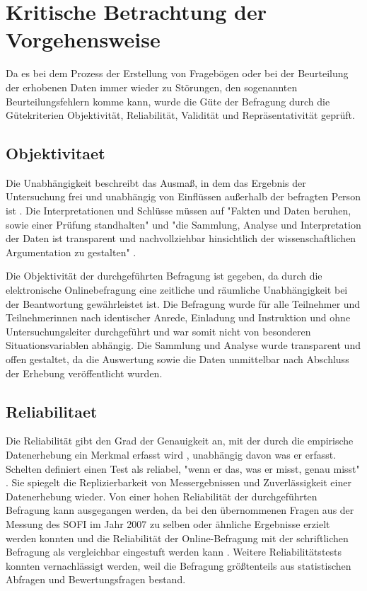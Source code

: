 \section{Kritische Betrachtung der Vorgehensweise}

Da es bei dem Prozess der Erstellung von Fragebögen oder bei der Beurteilung der erhobenen Daten immer wieder zu Störungen, den sogenannten Beurteilungsfehlern komme kann, wurde die Güte der Befragung durch die Gütekriterien Objektivität, Reliabilität, Validität und Repräsentativität geprüft.

\subsection{Objektivitaet}

Die Unabhängigkeit beschreibt das Ausmaß, in dem das Ergebnis der Untersuchung frei und unabhängig von Einflüssen außerhalb der befragten Person ist \cite{rost_2004_lehrbuch}. Die Interpretationen und Schlüsse müssen auf "Fakten und Daten beruhen, sowie einer Prüfung standhalten" und "die Sammlung, Analyse und Interpretation der Daten ist transparent und nachvollziehbar hinsichtlich der wissenschaftlichen Argumentation zu gestalten" \cite{Bargheer_2015}.

Die Objektivität der durchgeführten Befragung ist gegeben, da durch die elektronische Onlinebefragung eine zeitliche und räumliche Unabhängigkeit bei der Beantwortung gewährleistet ist. Die Befragung wurde für alle Teilnehmer und Teilnehmerinnen nach identischer Anrede, Einladung und Instruktion und ohne Untersuchungsleiter durchgeführt und war somit nicht von besonderen Situationsvariablen abhängig. Die Sammlung und Analyse wurde transparent und offen gestaltet, da die Auswertung sowie die Daten unmittelbar nach Abschluss der Erhebung veröffentlicht wurden.

\subsection{Reliabilitaet}

Die Reliabilität gibt den Grad der Genauigkeit an, mit der durch die empirische Datenerhebung ein Merkmal erfasst wird \cite{rost_2004_lehrbuch}, unabhängig davon was er erfasst. Schelten definiert einen Test als reliabel, "wenn er das, was er misst, genau misst" \cite{schelten_1997_testbeurteilung}.  Sie spiegelt die Replizierbarkeit von Messergebnissen und Zuverlässigkeit einer Datenerhebung wieder. Von einer hohen Reliabilität der durchgeführten Befragung kann ausgegangen werden, da bei den übernommenen Fragen aus der Messung des SOFI im Jahr 2007 zu selben oder ähnliche Ergebnisse erzielt werden konnten und die Reliabilität der Online-Befragung mit der schriftlichen Befragung als vergleichbar eingestuft werden kann \cite{Batinic_2003}. Weitere Reliabilitätstests konnten vernachlässigt werden, weil die Befragung größtenteils aus statistischen Abfragen und Bewertungsfragen bestand.

